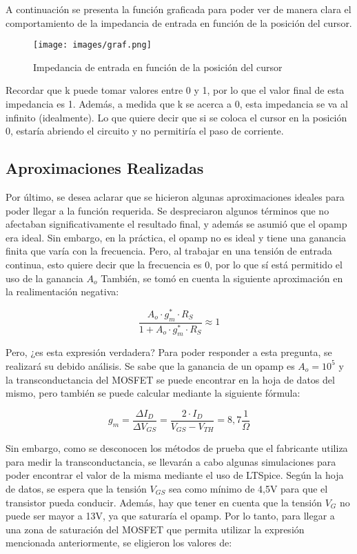 \documentclass[12pt,oneside,a4paper]{article}
\begin{document}
A continuación se presenta la función graficada para poder ver de manera clara el comportamiento de la
impedancia de entrada en función de la posición del cursor.

\begin{figure}[H]
    \centering
    \texttt{[image: images/graf.png]}
    \caption{Impedancia de entrada en función de la posición del cursor}
\end{figure}

Recordar que k puede tomar valores entre 0 y 1, por lo que el valor final de esta impedancia es 1. 
Además, a medida que k se acerca a 0, esta impedancia se va al infinito (idealmente). Lo que quiere decir 
que si se coloca el cursor en la posición 0, estaría abriendo el circuito y no permitiría el paso de corriente.

\newpage
\subsection*{Aproximaciones Realizadas}

Por último, se desea aclarar que se hicieron algunas aproximaciones ideales para poder llegar a la función 
requerida. Se despreciaron algunos términos que no afectaban significativamente el resultado final, y 
además se asumió que el opamp era ideal. Sin embargo, en la práctica, el opamp no es ideal y tiene una 
ganancia finita que varía con la frecuencia. Pero, al trabajar en una tensión de entrada continua, esto 
quiere decir que la frecuencia es 0, por lo que sí está permitido el uso de la ganancia $A_o$ 
También, se tomó en cuenta la siguiente aproximación en la realimentación negativa:

\begin{equation}
    \frac{A_o\cdot g_m^*\cdot R_S}{1 + A_o\cdot g_m^*\cdot R_S} \approx 1
\end{equation}

Pero, ¿es esta expresión verdadera? Para poder responder a esta pregunta, se realizará su debido 
análisis. Se sabe que la ganancia de un opamp es $A_o = 10^5$ y la transconductancia del MOSFET 
se puede encontrar en la hoja de datos del mismo, pero también se puede calcular mediante la siguiente
fórmula:

\begin{equation}
    g_m = \frac{\Delta I_D}{\Delta V_{GS}} = \frac{2\cdot I_D}{V_{GS} - V_{TH}} = 8,7\frac{1}{\Omega}
\end{equation}

Sin embargo, como se desconocen los métodos de prueba que el fabricante utiliza para medir la 
transconductancia, se llevarán a cabo algunas simulaciones para poder encontrar el valor de la 
misma mediante el uso de LTSpice. Según la hoja de datos, se espera que la tensión $V_{GS}$ sea 
como mínimo de 4,5V para que el transistor pueda conducir. Además, hay que tener en cuenta que 
la tensión $V_G$ no puede ser mayor a 13V, ya que saturaría el opamp. Por lo tanto, para llegar a una zona 
de saturación del MOSFET que permita utilizar la expresión mencionada anteriormente, se eligieron 
los valores de:
\end{document}

